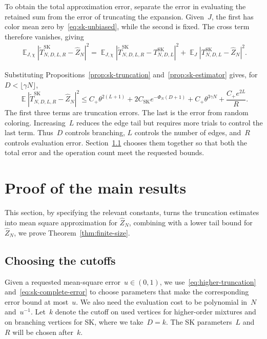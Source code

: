\documentclass[letterpaper,11pt,reqno]{amsart}
\renewcommand{\leq}{\leqslant}
\DeclareMathOperator{\E}{\mathds{E}}
\begin{document}
To obtain the total approximation error, separate the error in evaluating the retained sum from the error of truncating the expansion. Given~$J$, the first has color mean zero by~\eqref{eq:sk-unbiased}, while the second is fixed. The cross term therefore vanishes, giving
\begin{align*}
\E_{J,\chi}|\widetilde T^{\mathrm{SK}}_{N,D,L,R}-\widehat Z_N|^2
=\E_{J,\chi}|\widetilde T^{\mathrm{SK}}_{N,D,L,R}-T^{\mathrm{SK}}_{N,D,L}|^2
+\E_J|T^{\mathrm{SK}}_{N,D,L}-\widehat Z_N|^2.
\end{align*}

Substituting Propositions~\ref{prop:sk-truncation} and~\ref{prop:sk-estimator} gives, for~$D<\lfloor\gamma N\rfloor$,
\begin{equation}\label{eq:sk-complete-error}
\E|\widetilde T^{\mathrm{SK}}_{N,D,L,R}-\widehat Z_N|^2
\leq C_+\theta^{2(L+1)}+2C_{\mathrm{SK}}e^{-\Phi_N(D+1)}+C_+\theta^{3\gamma N}+\frac{C_+e^{2L}}R.
\end{equation}
The first three terms are truncation errors. The last is the error from random coloring. Increasing~$L$ reduces the edge tail but requires more trials to control the last term. Thus~$D$ controls branching, $L$ controls the number of edges, and~$R$ controls evaluation error. Section~\ref{subsec:cutoff-selection} chooses them together so that both the total error and the operation count meet the requested bounds.

\section{Proof of the main results}\label{sec:error-complexity}

This section, by specifying the relevant constants, turns the truncation estimates into mean square approximation for $\hat{Z}_N$, combining with  a lower tail bound for $\hat{Z}_N$, we prove Theorem~\ref{thm:finite-size}.

\subsection{Choosing the cutoffs}\label{subsec:cutoff-selection}

Given a requested mean-square error~$u\in(0,1)$, we use~\eqref{eq:higher-truncation} and~\eqref{eq:sk-complete-error} to choose parameters that make the corresponding error bound at most~$u$. We also need the evaluation cost to be polynomial in~$N$ and~$u^{-1}$. Let~$k$ denote the cutoff on used vertices for higher-order mixtures and on branching vertices for SK, where we take~$D=k$. The SK parameters~$L$ and~$R$ will be chosen after~$k$.
\end{document}
